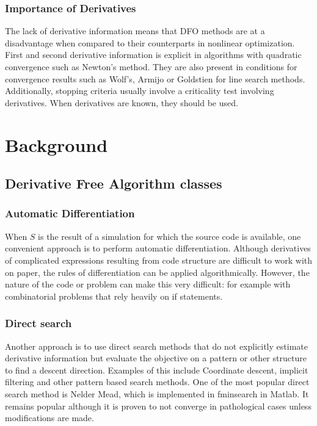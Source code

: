 \documentclass{article}
\begin{document}
\subsubsection{Importance of Derivatives}

The lack of derivative information means that DFO methods are at a disadvantage when compared to their counterparts in nonlinear optimization.
First and second derivative information is explicit in algorithms with quadratic convergence such as Newton's method.
They are also present in conditions for convergence results such as Wolf's, Armijo or Goldstien for line search methods.
Additionally, stopping criteria usually involve a criticality test involving derivatives.
When derivatives are known, they should be used.

\subsection{}

\section{Background}
\subsection{Derivative Free Algorithm classes}
\subsubsection{Automatic Differentiation}

When $S$ is the result of a simulation for which the source code is available, one convenient approach is to perform automatic differentiation.
Although derivatives of complicated expressions resulting from code structure are difficult to work with on paper, the rules of differentiation can be applied algorithmically.
However, the nature of the code or problem can make this very difficult: for example with combinatorial problems that rely heavily on if statements.

\subsubsection{Direct search}


Another approach is to use direct search methods that do not explicitly estimate derivative information but evaluate the objective on a pattern or other structure to find a descent direction.
Examples of this include Coordinate descent, implicit filtering and other pattern based search methods.
One of the most popular direct search method is Nelder Mead, which is implemented in fminsearch in Matlab.
It remains popular although it is proven to not converge in pathological cases unless modifications are made.
\end{document}
